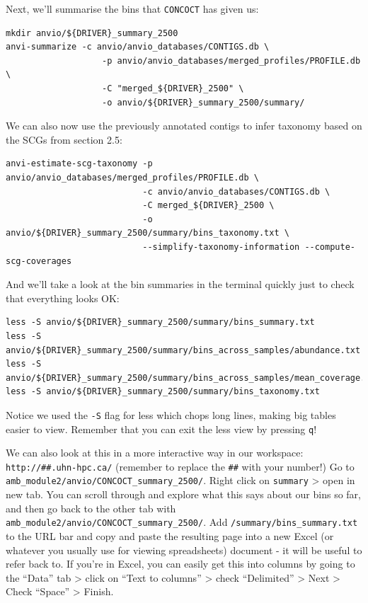 \documentclass[
]{book}
\begin{document}
Next, we'll summarise the bins that \texttt{CONCOCT} has given us:

\begin{verbatim}
mkdir anvio/${DRIVER}_summary_2500
anvi-summarize -c anvio/anvio_databases/CONTIGS.db \
                   -p anvio/anvio_databases/merged_profiles/PROFILE.db \
                   -C "merged_${DRIVER}_2500" \
                   -o anvio/${DRIVER}_summary_2500/summary/
\end{verbatim}

We can also now use the previously annotated contigs to infer taxonomy based on the SCGs from section 2.5:

\begin{verbatim}
anvi-estimate-scg-taxonomy -p anvio/anvio_databases/merged_profiles/PROFILE.db \
                           -c anvio/anvio_databases/CONTIGS.db \
                           -C merged_${DRIVER}_2500 \
                           -o anvio/${DRIVER}_summary_2500/summary/bins_taxonomy.txt \
                           --simplify-taxonomy-information --compute-scg-coverages
\end{verbatim}

And we'll take a look at the bin summaries in the terminal quickly just to check that everything looks OK:

\begin{verbatim}
less -S anvio/${DRIVER}_summary_2500/summary/bins_summary.txt
less -S anvio/${DRIVER}_summary_2500/summary/bins_across_samples/abundance.txt
less -S anvio/${DRIVER}_summary_2500/summary/bins_across_samples/mean_coverage.txt
less -S anvio/${DRIVER}_summary_2500/summary/bins_taxonomy.txt
\end{verbatim}

Notice we used the \texttt{-S} flag for less which chops long lines, making big tables easier to view.
Remember that you can exit the less view by pressing \texttt{q}!

We can also look at this in a more interactive way in our workspace: \texttt{http://\#\#.uhn-hpc.ca/} (remember to replace the \texttt{\#\#} with your number!) Go to \texttt{amb\_module2/anvio/CONCOCT\_summary\_2500/}. Right click on \texttt{summary} \textgreater{} open in new tab. You can scroll through and explore what this says about our bins so far, and then go back to the other tab with \texttt{amb\_module2/anvio/CONCOCT\_summary\_2500/}. Add \texttt{/summary/bins\_summary.txt} to the URL bar and copy and paste the resulting page into a new Excel (or whatever you usually use for viewing spreadsheets) document - it will be useful to refer back to. If you're in Excel, you can easily get this into columns by going to the ``Data'' tab \textgreater{} click on ``Text to columns'' \textgreater{} check ``Delimited'' \textgreater{} Next \textgreater{} Check ``Space'' \textgreater{} Finish.
\end{document}
